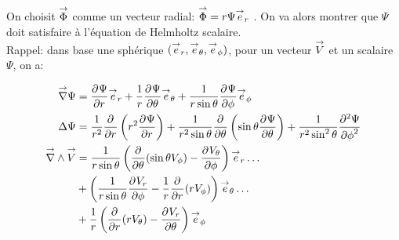 On choisit \(\vect \Phi\) comme un vecteur radial: \(\vect \Phi = r \Psi \vect e_r\) \cite[p.~84]{bohren_absorption_2004}. On va alors montrer que \(\Psi\) doit satisfaire à l'équation de Helmholtz scalaire.\\

Rappel: dans base une sphérique \((\vect e_r, \vect e_\theta, \vect e_\phi)\), pour
un vecteur \(\vect V\)
et un scalaire \(\Psi\), on a:

\begin{align*}
\vgrad \Psi &= \ddr{r}{\Psi} \vect e_r + \frac{1}{r}\ddr{\theta}{\Psi}\vect e_\theta + \frac{1}{r\sin\theta}\ddr{\phi}{\Psi} \vect e_\phi\\
 \Delta \Psi & = \frac{1}{r^2}\ddr{r}{}\left(r^2\ddr{r}{\Psi}\right)
+ \frac{1}{r^2\sin\theta}\ddr{\theta}{}\left(\sin\theta\ddr{\theta}{\Psi}\right)
+ \frac{1}{r^2\sin^2\theta}\ddr[2]{\phi}{\Psi} \\
\vrot \vect V &= \frac{1}{r\sin\theta}\left(\ddr{\theta}{}(\sin\theta V_\phi)-\ddr{\phi}{V_\theta}\right)\vect e_r \dots\\
&+ \left(\frac{1}{r\sin\theta}\ddr{\phi}{V_r} - \frac{1}{r}\ddr{r}{}(rV_\phi)\right) \vect e_\theta \dots \\
&+ \frac{1}{r}\left( \ddr{r}{}(rV_\theta) - \ddr{\theta}{V_r}\right)\vect e_\phi
\end{align*}



